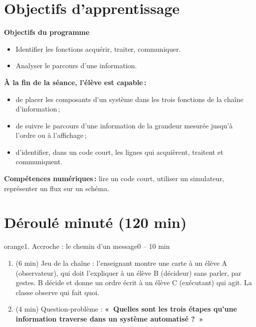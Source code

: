 \documentclass[11pt,a4paper]{article}
\begin{document}
\section{Objectifs d'apprentissage}
\begin{tcolorbox}[colback=gray!8,colframe=gray!60!black,arc=1mm,boxrule=0.5pt]
\textbf{Objectifs du programme}
\begin{itemize}
 \item Identifier les fonctions acquérir, traiter, communiquer.
 \item Analyser le parcours d'une information.
\end{itemize}
\textbf{À la fin de la séance, l'élève est capable\,:}
\begin{itemize}
 \item de placer les composants d'un système dans les trois fonctions de la chaîne d'information\,;
 \item de suivre le parcours d'une information de la grandeur mesurée jusqu'à l'ordre ou à l'affichage\,;
 \item d'identifier, dans un code court, les lignes qui acquièrent, traitent et communiquent.
\end{itemize}
\textbf{Compétences numériques\,:} lire un code court, utiliser un simulateur, représenter un flux sur un schéma.
\end{tcolorbox}

\section{Déroulé minuté (120 min)}

\begin{etape}{orange}{1. Accroche : le chemin d'un message}{0 -- 10 min}
\begin{enumerate}
 \item (6 min) Jeu de la chaîne : l'enseignant montre une carte à un élève A (observateur), qui doit l'expliquer à un élève B (décideur) sans parler, par gestes. B décide et donne un ordre écrit à un élève C (exécutant) qui agit. La classe observe qui fait quoi.
 \item (4 min) Question-problème : \textbf{«~Quelles sont les trois étapes qu'une information traverse dans un système automatisé ?~»}
\end{enumerate}
\end{etape}
\end{document}
